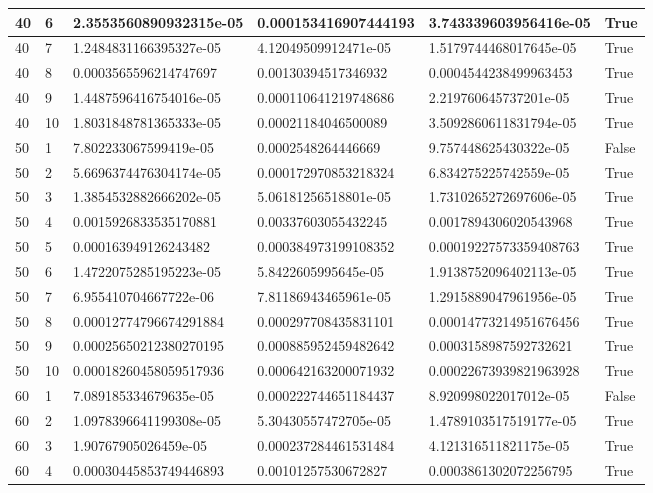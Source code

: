 \documentclass[a4paper, 12pt]{report}
\def\tabsize{4.4cm}
\def\stabsize{0.97cm}
\def\mtabsize{0.73cm}
\begin{document}
\begin{center}
\begin{longtable}{|m{\stabsize}|m{\stabsize}|m{\tabsize}|m{\tabsize}|m{\tabsize}|m{\mtabsize}|}
40 & 6 & 2.3553560890932315e-05 & 0.000153416907444193 & 3.743339603956416e-05 & True \\ \hline  
40 & 7 & 1.2484831166395327e-05 & 4.12049509912471e-05 & 1.5179744468017645e-05 & True \\ \hline  
40 & 8 & 0.0003565596214747697 & 0.00130394517346932 & 0.0004544238499963453 & True \\ \hline  
40 & 9 & 1.4487596416754016e-05 & 0.000110641219748686 & 2.219760645737201e-05 & True \\ \hline  
40 & 10 & 1.8031848781365333e-05 & 0.00021184046500089 & 3.5092860611831794e-05 & True \\ \hline  
50 & 1 & 7.802233067599419e-05 & 0.0002548264446669 & 9.757448625430322e-05 & False \\ \hline  
50 & 2 & 5.6696374476304174e-05 & 0.000172970853218324 & 6.834275225742559e-05 & True \\ \hline  
50 & 3 & 1.3854532882666202e-05 & 5.06181256518801e-05 & 1.7310265272697606e-05 & True \\ \hline  
50 & 4 & 0.0015926833535170881 & 0.00337603055432245 & 0.0017894306020543968 & True \\ \hline  
50 & 5 & 0.000163949126243482 & 0.000384973199108352 & 0.00019227573359408763 & True \\ \hline  
50 & 6 & 1.4722075285195223e-05 & 5.8422605995645e-05 & 1.9138752096402113e-05 & True \\ \hline  
50 & 7 & 6.955410704667722e-06 & 7.81186943465961e-05 & 1.2915889047961956e-05 & True \\ \hline  
50 & 8 & 0.00012774796674291884 & 0.000297708435831101 & 0.00014773214951676456 & True \\ \hline  
50 & 9 & 0.00025650212380270195 & 0.000885952459482642 & 0.0003158987592732621 & True \\ \hline  
50 & 10 & 0.00018260458059517936 & 0.000642163200071932 & 0.00022673939821963928 & True \\ \hline  
60 & 1 & 7.089185334679635e-05 & 0.000222744651184437 & 8.920998022017012e-05 & False \\ \hline  
60 & 2 & 1.0978396641199308e-05 & 5.30430557472705e-05 & 1.4789103517519177e-05 & True \\ \hline  
60 & 3 & 1.90767905026459e-05 & 0.000237284461531484 & 4.121316511821175e-05 & True \\ \hline  
60 & 4 & 0.00030445853749446893 & 0.00101257530672827 & 0.0003861302072256795 & True \\ \hline  

\end{longtable}
\end{center}
\end{document}
